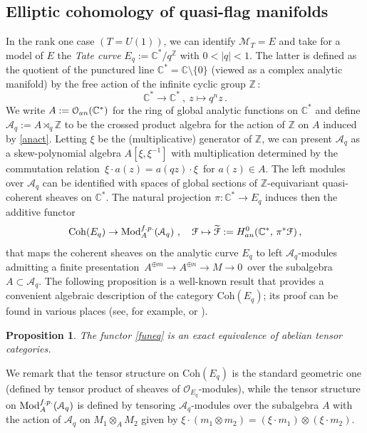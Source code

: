 \documentclass[11pt]{amsart}
\newtheorem{prop}[theorem]{Proposition}
\theoremstyle{definition}
\theoremstyle{remark}
\numberwithin{equation}{section}
\newcommand{\la}{\label}
\def\c{\mathbb{C}}
\def\A{\mathcal{A}}
\def\M{\mathcal{M}}
\def\Z{\mathbb{Z}}
\def\O{\mathcal{O}}
\def\Mod{\mathrm{Mod}}
\def\Coh{\mathrm{Coh}}
\def \cF{\mathcal{F}}
\begin{document}
\subsection{Elliptic cohomology of quasi-flag manifolds}
\la{S7.2}
In the rank one case $(T = U(1))$, we can identify $ \M_T = E $ and take for a model of $E$ 
the {\it Tate curve} $ E_q := \c^*\!/q^{\Z} $ with $ 0 < |q| < 1 $. The latter is defined
as the quotient of the punctured line $ \c^* = \c\setminus\{0\} $ (viewed as a complex
analytic manifold) by the free action of the infinite cyclic group $\Z\,$:
%
\begin{equation}
\la{anact}
\c^* \to \c^*\ ,\ z \mapsto q^n z\,.  
\end{equation}
%
We write $ A := \O_{\rm an}(\c^*) $ for the ring of global analytic functions on $ \c^* $ and 
define $ \A_q := A \rtimes_q \Z $ to be the crossed product algebra for the action of $\Z$ on $A$
induced by \eqref{anact}. Letting $ \xi $ be the (multiplicative) generator of $\Z$, we 
can present $ \A_q $ as a skew-polynomial algebra $A[\xi, \xi^{-1}]$ with multiplication determined by the commutation relation $\,\xi \cdot a(z) = a(qz) \cdot \xi \,$ for $ a(z) \in A $.  The left modules over $\A_q$
can be identified with spaces of global sections of $\Z$-equivariant quasi-coherent sheaves on $\c^*$. The natural projection $ \pi: \c^* \to E_q $ induces then the additive functor
%
\begin{equation}
\la{funeq}
\Coh(E_q) \to \Mod^{\rm f.p.}_{A}(\A_q)\ ,\quad
\cF \mapsto \widetilde{\cF} := H_{\rm an}^0(\c^*,\,\pi^*\cF)\,,    
\end{equation}
%
that maps the coherent sheaves on the analytic curve $E_q$ to left $\A_q$-modules admitting a finite presentation $\,A^{\oplus m} \to A^{\oplus n} \to M \to 0\,$ over the subalgebra $ A \subset \A_q $. 
The following proposition is a well-known result that provides a convenient algebraic description of the category $ \Coh(E_q) $; its proof can be found in various places (see, for example, \cite[Thm 2.2]{SV03} or \cite[Sect. 2]{vdPR07}).
%
\begin{prop}
\la{PSV}
The functor \eqref{funeq} is an exact equivalence of abelian tensor categories.
\end{prop}
%
We remark that the tensor structure on $ \Coh(E_q) $ is the standard geometric one (defined by tensor product of sheaves of $\O_{E_q}$-modules), while the tensor structure on $ \Mod^{\rm f.p.}_{A}(\A_q) $
is defined by tensoring $\A_q$-modules over the subalgebra $A$ with the action of $\A_q$ on $ M_1 \otimes_A M_2 $ given by $ \xi \cdot (m_1 \otimes m_2 ) = (\xi\cdot m_1) \otimes (\xi \cdot m_2) $.
\end{document}
